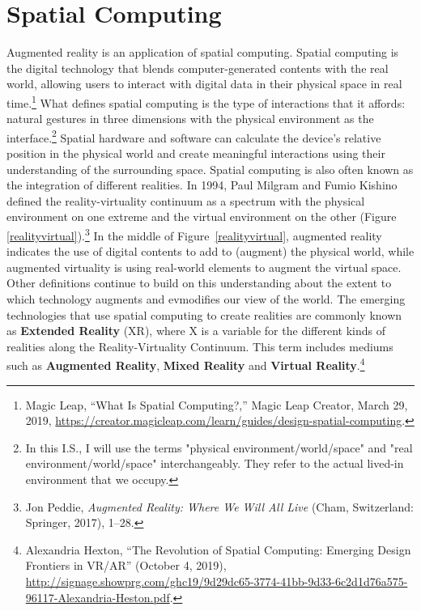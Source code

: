 \section{Spatial Computing}
Augmented reality is an application of spatial computing. Spatial computing is the digital technology that blends computer-generated contents with the real world, allowing users to interact with digital data in their physical space in real time.\footnote{Magic Leap, “What Is Spatial Computing?,” Magic Leap Creator, March 29, 2019, \url{https://creator.magicleap.com/learn/guides/design-spatial-computing}.} What defines spatial computing is the type of interactions that it affords: natural gestures in three dimensions with the physical environment as the interface.\footnote{In this I.S., I will use the terms "physical environment/world/space" and "real environment/world/space" interchangeably. They refer to the actual lived-in environment that we occupy.}  Spatial hardware and software can calculate the device's relative position in the physical world and create meaningful interactions using their understanding of the surrounding space. Spatial computing is also often known as the integration of different realities. In 1994, Paul Milgram and Fumio Kishino defined the reality-virtuality continuum as a spectrum with the physical environment on one extreme and the  virtual environment on the other (Figure \ref{realityvirtual}).\footnote{Jon Peddie, \textit{Augmented Reality: Where We Will All Live} (Cham, Switzerland: Springer, 2017), 1–28.} In the middle of Figure~\ref{realityvirtual}, augmented reality indicates the use of digital contents to add to (augment) the physical world, while augmented virtuality is using real-world elements to augment the virtual space. Other definitions continue to build on this understanding about the extent to which technology augments and ev\en modifies our view of the world. The emerging technologies that use spatial computing to create realities are commonly known as \textbf{Extended Reality} (XR), where X is a variable for the different kinds of realities along the Reality-Virtuality Continuum. This term includes mediums such as \textbf{Augmented Reality}, \textbf{Mixed Reality} and \textbf{Virtual Reality}.\footnote{Alexandria Hexton, “The Revolution of Spatial Computing: Emerging Design Frontiers in VR/AR” (October 4, 2019), \url{http://signage.showprg.com/ghc19/9d29dc65-3774-41bb-9d33-6c2d1d76a575-96117-Alexandria-Heston.pdf}.}

\begin{figure}[!ht]
\vspace{-.1 in}
\end{figure}


